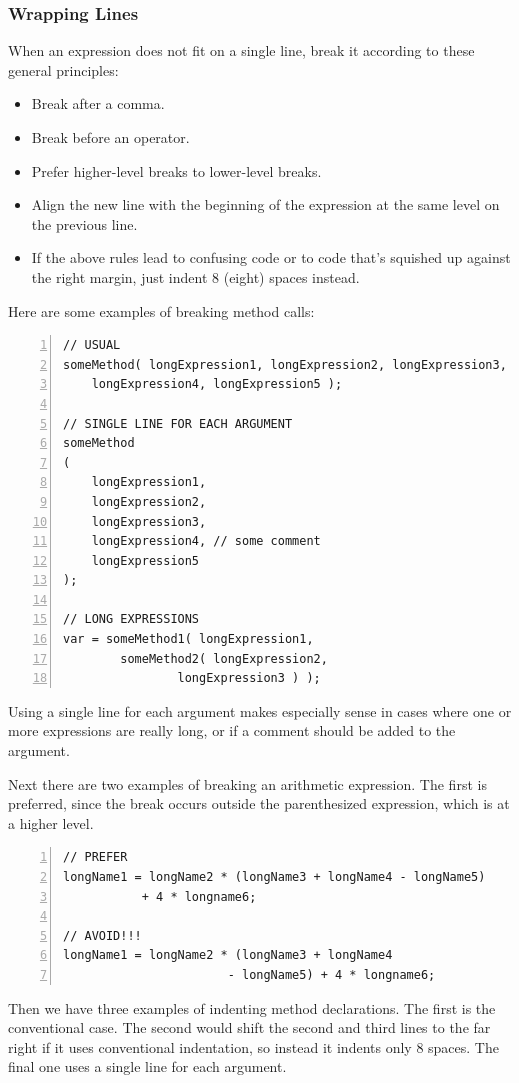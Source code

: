 \documentclass[12pt,a4paper,titlepage, parskip=half, headsepline, footsepline, cleardoubleplain]{scrbook}
\begin{document}
\subsubsection{Wrapping Lines}\label{sec:WrappingLines}
When an expression does not fit on a single line, break it according to these general principles:
\begin{itemize}[nosep]
\item{Break after a comma.}
\item{Break before an operator.}
\item{Prefer higher-level breaks to lower-level breaks.}
\item{Align the new line with the beginning of the expression at the same level on the previous line.}
\item{If the above rules lead to confusing code or to code that's squished up against the right margin, just indent 8 (eight) spaces instead.}
\end{itemize}

Here are some examples of breaking method calls:
\begin{lstlisting}[numbers=left]
// USUAL
someMethod( longExpression1, longExpression2, longExpression3,
    longExpression4, longExpression5 );
        
// SINGLE LINE FOR EACH ARGUMENT
someMethod
( 
    longExpression1,
    longExpression2,
    longExpression3,
    longExpression4, // some comment
    longExpression5
);

// LONG EXPRESSIONS
var = someMethod1( longExpression1,
        someMethod2( longExpression2,
                longExpression3 ) );
\end{lstlisting}

Using a single line for each argument makes especially sense in cases where one or more expressions are really long, or if a comment should be added to the argument.

Next there are two examples of breaking an arithmetic expression. The first is preferred, since the break occurs outside the parenthesized expression, which is at a higher level.
\begin{lstlisting}[numbers=left]
// PREFER
longName1 = longName2 * (longName3 + longName4 - longName5)
           + 4 * longname6;
           
// AVOID!!!           
longName1 = longName2 * (longName3 + longName4
                       - longName5) + 4 * longname6;
\end{lstlisting}

Then we have three examples of indenting method declarations. The first is the conventional case. The second would shift the second and third lines to the far right if it uses conventional indentation, so instead it indents only 8 spaces. The final one uses a single line for each argument.
\end{document}
